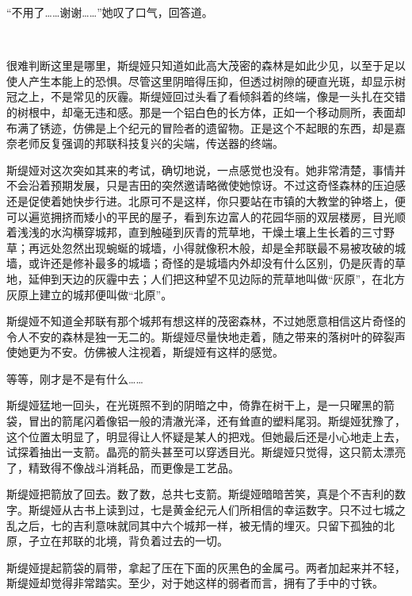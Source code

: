 \documentclass[a5paper, punct=kaiming, fontset=founder]{ctexart}
\newcommand{\emptypar}{\ }
\begin{document}
“不用了……谢谢……”她叹了口气，回答道。

\emptypar

很难判断这里是哪里，斯缇娅只知道如此高大茂密的森林是如此少见，以至于足以使人产生本能上的恐惧。尽管这里阴暗得压抑，但透过树隙的硬直光斑，却显示树冠之上，不是常见的灰霾。斯缇娅回过头看了看倾斜着的终端，像是一头扎在交错的树根中，却毫无违和感。那是一个铝白色的长方体，正如一个移动厕所，表面却布满了锈迹，仿佛是上个纪元的冒险者的遗留物。正是这个不起眼的东西，却是嘉奈老师反复强调的邦联科技复兴的尖端，传送器的终端。

斯缇娅对这次突如其来的考试，确切地说，一点感觉也没有。她非常清楚，事情并不会沿着预期发展，只是吉田的突然邀请略微使她惊讶。不过这奇怪森林的压迫感还是促使着她快步行进。北原可不是这样，你只要站在市镇的大教堂的钟塔上，便可以遍览拥挤而矮小的平民的屋子，看到东边富人的花园华丽的双层楼房，目光顺着浅浅的水沟横穿城邦，直到触碰到灰青的荒草地，干燥土壤上生长着的三寸野草；再远处忽然出现蜿蜒的城墙，小得就像积木般，却是全邦联最不易被攻破的城墙，或许还是修补最多的城墙；奇怪的是城墙内外却没有什么区别，仍是灰青的草地，延伸到天边的灰霾中去；人们把这种望不见边际的荒草地叫做“灰原”，在北方灰原上建立的城邦便叫做“北原”。

斯缇娅不知道全邦联有那个城邦有想这样的茂密森林，不过她愿意相信这片奇怪的令人不安的森林是独一无二的。斯缇娅尽量快地走着，随之带来的落树叶的碎裂声使她更为不安。仿佛被人注视着，斯缇娅有这样的感觉。

等等，刚才是不是有什么……

斯缇娅猛地一回头，在光斑照不到的阴暗之中，倚靠在树干上，是一只曜黑的箭袋，冒出的箭尾闪着像铝一般的清澈光泽，还有耸直的塑料尾羽。斯缇娅犹豫了，这个位置太明显了，明显得让人怀疑是某人的把戏。但她最后还是小心地走上去，试探着抽出一支箭。晶亮的箭头甚至可以穿透目光。斯缇娅只觉得，这只箭太漂亮了，精致得不像战斗消耗品，而更像是工艺品。

斯缇娅把箭放了回去。数了数，总共七支箭。斯缇娅暗暗苦笑，真是个不吉利的数字。斯缇娅从古书上读到过，七是黄金纪元人们所相信的幸运数字。只不过七城之乱之后，七的吉利意味就同其中六个城邦一样，被无情的埋灭。只留下孤独的北原，孑立在邦联的北境，背负着过去的一切。

斯缇娅提起箭袋的肩带，拿起了压在下面的灰黑色的金属弓。两者加起来并不轻，斯缇娅却觉得非常踏实。至少，对于她这样的弱者而言，拥有了手中的寸铁。
\end{document}
